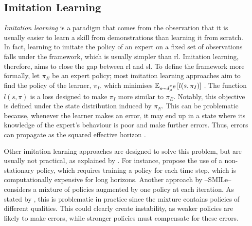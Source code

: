 \subsection{Imitation Learning}
\label{subsec:imitation_learning}
\emph{Imitation learning} is a paradigm that comes from the observation that it is usually easier to learn a skill from demonstrations than learning it from scratch. 
In fact, learning to imitate the policy of an expert on a fixed set of observations falls under the \emph{} framework, which is usually simpler than \gls{rl}.
Imitation learning, therefore, aims to close the gap between \gls{rl} and \gls{sl}.
To define the framework more formally, let $\pi_E$ be an expert policy; most imitation learning approaches aim to find the policy of the learner, $\pi_I$, which minimises $\textstyle\operatorname*{\mathbb{E}}_{s\sim d_\mu^{\pi_E}}[l(s,\pi_I)]$ \cite{ross2011reduction}. 
The function $l(s,\pi)$ is a loss designed to make $\pi_I$ more similar to $\pi_E$.
Notably, this objective is defined under the state distribution induced by $\pi_E$.
This can be problematic because, whenever the learner makes an error, it may end up in a state where its knowledge of the expert's behaviour is poor and make further errors.
Thus, errors can propagate as the squared effective horizon \cite[Theorem~2.1]{ross2010efficient}\cite[Theorem~1]{xu2020error}.

Other imitation learning approaches are designed to solve this problem, but are usually not practical, as explained by \cite{ross2011reduction}. 
For instance, \cite{ross2010efficient} propose the use of a non-stationary policy, which requires training a policy for each time step, which is computationally expensive for long horizons. 
Another approach by \cite{ross2010efficient}--SMILe--considers a mixture of policies augmented by one policy at each iteration. 
As stated by \cite{ross2011reduction}, this is problematic in practice since the mixture contains policies of different qualities. 
This could clearly create instability, as weaker policies are likely to make errors, while stronger policies must compensate for these errors.

